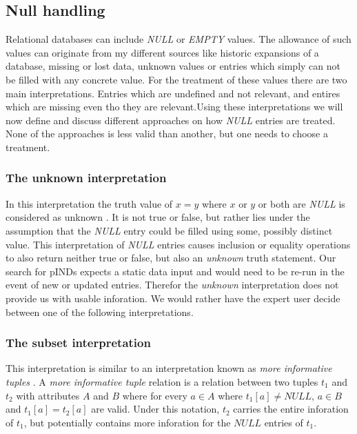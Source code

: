 \subsection{Null handling}
Relational databases can include \textit{NULL} or \textit{EMPTY} values.
The allowance of such values can originate from my different sources like historic expansions of a database, missing or lost data, unknown values or entries which simply can not be filled with any concrete value. For the treatment of these values there are two main interpretations. %
Entries which are undefined and not relevant, and entires which are missing even tho they are relevant.Using these interpretations we will now define and discuss different approaches on how \textit{NULL} entries are treated. None of the approaches is less valid than another, but one needs to choose a treatment.

\subsubsection*{The \textbf{unknown} interpretation}
In this interpretation the truth value of $x = y$ where $x$ or $y$ or both are \textit{NULL} is considered as unknown \cite{codd1979extending}.
It is not true or false, but rather lies under the assumption that the \textit{NULL} entry could be filled using some,
possibly distinct value. This interpretation of \textit{NULL} entries causes inclusion or equality operations to also
return neither true or false, but also an \textit{unknown} truth statement.
Our search for pINDs expects a static data input and would need to be re-run in the event of new or updated entries.
Therefor the \textit{unknown} interpretation does not provide us with usable inforation. We would rather have the
expert user decide between one of the following interpretations.

\subsubsection*{The \textbf{subset} interpretation}
This interpretation is similar to an interpretation known as \textit{more informative tuples} \cite{zaniolo1982database}.
A \textit{more informative tuple} relation is a relation between two tuples $t_1$ and $t_2$ with attributes $A$ and $B$
where for every $a \in A$ where $t_1[a] \not = NULL$, $a \in B$ and $t_1[a] = t_2[a]$ are valid. Under this notation,
$t_2$ carries the entire inforation of $t_1$, but potentially contains more inforation for the $NULL$ entries of $t_1$.


